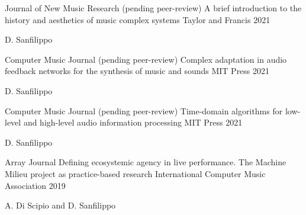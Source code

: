 

\begin{cventries}

  \cventry
    {Journal of New Music Research} %
    {(pending peer-review) A brief introduction to the history and aesthetics of music complex systems} %
    {Taylor and Francis} %
    {2021} %
    {
      \begin{cvitems} %
        \item {D. Sanfilippo}
      \end{cvitems}
    }

  \cventry
    {Computer Music Journal} %
    {(pending peer-review) Complex adaptation in audio feedback networks for the synthesis of music and sounds} %
    {MIT Press} %
    {2021} %
    {
      \begin{cvitems} %
        \item {D. Sanfilippo}
      \end{cvitems}
    }

  \cventry
    {Computer Music Journal} %
    {(pending peer-review) Time-domain algorithms for low-level and high-level audio information processing} %
    {MIT Press} %
    {2021} %
    {
      \begin{cvitems} %
        \item {D. Sanfilippo}
      \end{cvitems}
    }

  \cventry
    {Array Journal} %
    {Defining ecosystemic agency in live performance. The Machine Milieu project as practice-based research} %
    {International Computer Music Association} %
    {2019} %
    {
      \begin{cvitems} %
        \item {A. Di Scipio and D. Sanfilippo}
      \end{cvitems}
    }


\end{cventries}
